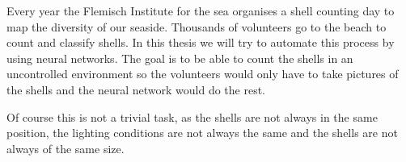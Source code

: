 Every year the Flemisch Institute for the sea organises a shell counting day to map the diversity of our seaside. 
Thousands of volunteers go to the beach to count and classify shells. 
In this thesis we will try to automate this process by using neural networks.
The goal is to be able to count the shells in an uncontrolled environment so the volunteers would only have to take pictures of the shells and the neural network would do the rest.

Of course this is not a trivial task, as the shells are not always in the same position, 
the lighting conditions are not always the same and the shells are not always of the same size.

